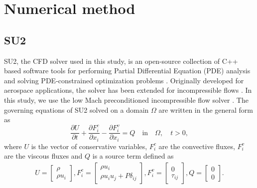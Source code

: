 \section{Numerical method}\label{sec:nummethods}

\subsection{SU2}\label{ssec:su2}
SU2, the CFD solver used in this study, is an open-source collection of C++ based software tools for performing Partial Differential Equation (PDE) analysis and solving PDE-constrained optimization problems \cite{SU22014}. 
Originally developed for aerospace applications, the solver has been extended for incompressible flows \cite{SU2incomp2019,koodly2020implementation}. In this study, we use the low Mach preconditioned incompressible flow solver \cite{SU2incomp2019}. The governing equations of SU2 solved on a domain $\Omega$ are written in the general form as
\begin{equation}
\frac{\partial U}{\partial t} + \frac{\partial F^c_i}{\partial x_i}-\frac{\partial F^v_i}{\partial x_i}=Q \quad \text{in} \quad \Omega, \quad t>0,
\label{eq:generic}
\end{equation}
where $U$ is the vector of conservative variables, $F^c_i$ are the convective fluxes, $F^v_i$ are the viscous fluxes and $Q$ is a source term defined as
\begin{align}
    U=\begin{bmatrix}{}
    \rho \\
    \rho u_i
    \end{bmatrix},
    F^c_i = \begin{bmatrix}{}
    \rho u_i \\
    \rho u_i u_j + P\delta_{ij}
    \end{bmatrix},
    F^v_i = \begin{bmatrix}{}
   0 \\
    \tau_{ij} 
    \end{bmatrix},
    Q = \begin{bmatrix}{}
    0 \\
    0
    \end{bmatrix}.
\end{align}{}
